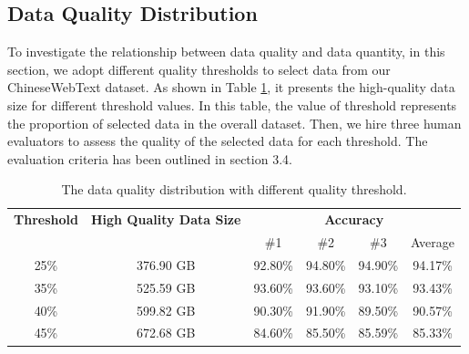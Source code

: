 \documentclass{article}
\begin{document}


\subsection{Data Quality Distribution}

To investigate the relationship between data quality and data quantity, in this section, we adopt different quality thresholds to select data from our ChineseWebText dataset. As shown in Table \ref{data quality distribution}, it presents the high-quality data size for different threshold values. In this table, the value of threshold represents the proportion of selected data in the overall dataset. Then, we hire three human evaluators to assess the quality of the selected data for each threshold. The evaluation criteria has been outlined in section 3.4. 


\begin{table}[htb]
\centering
     \caption{The data quality distribution with different quality threshold.}
    \label{data quality distribution}
    \begin{tabular}{cccccc}
    \toprule
    \multirow{2.5}{*}{\textbf{Threshold}} & \multirow{2.5}{*}{\textbf{High Quality Data Size}}&         \multicolumn{4}{c}{\textbf{Accuracy}}\\
    \cmidrule{3-6}
    & & \#1 &  \#2 & \#3 &{Average} \\
    \midrule 
    25\% & 376.90 GB & 92.80\% & 94.80\% & 94.90\% & 94.17\%  \\  
    35\% & 525.59 GB & 93.60\% & 93.60\% & 93.10\% & 93.43\% \\ 
    40\% & 599.82 GB & 90.30\% & 91.90\% & 89.50\% & 90.57\%  \\
    45\% & 672.68 GB & 84.60\% & 85.50\% & 85.59\% & 85.33\% \\
    \bottomrule
    \end{tabular}
   
\end{table}
\end{document}
